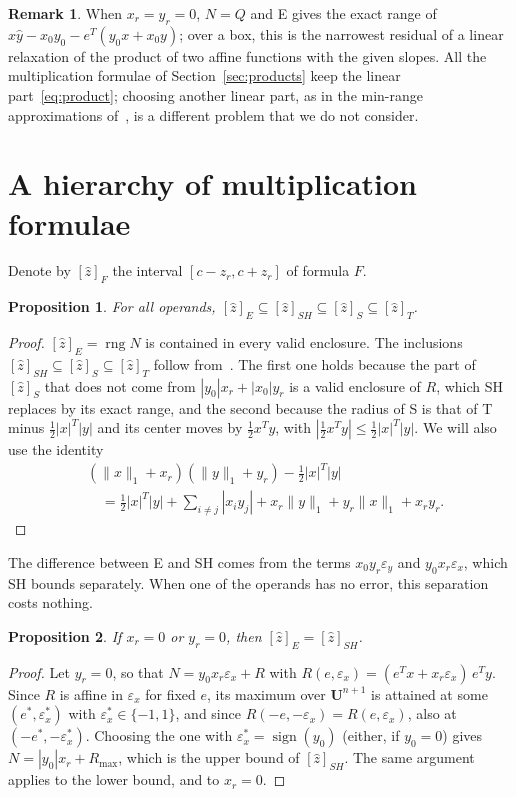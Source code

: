 \documentclass[10pt]{article}
\newtheorem{propo}{Proposition}
\theoremstyle{definition}
\newtheorem{remark}{Remark}
\newcommand{\U}{\mathbf{U}}
\newcommand{\eps}{\varepsilon}
\newcommand{\ex}{\eps_x}
\newcommand{\ey}{\eps_y}
\newcommand{\rng}{\operatorname{rng}}
\begin{document}
\begin{remark}
When $x_r=y_r=0$, $N=Q$ and E gives the exact range of $\hat x\hat y - x_0y_0 - e^T(y_0x+x_0y)$; over a box, this is the narrowest residual of a linear relaxation of the product of two affine functions with the given slopes. All the multiplication formulae of Section~\ref{sec:products} keep the linear part~\eqref{eq:product}; choosing another linear part, as in the min-range approximations of~\cite{stolfi1997self,skalna2013minrange}, is a different problem that we do not consider.
\end{remark}

\section{A hierarchy of multiplication formulae}
\label{sec:hierarchy}

Denote by $[\hat z]_F$ the interval $[c-z_r,c+z_r]$ of formula $F$.

\begin{propo}
\label{prop:chain}
For all operands, $[\hat z]_E \subseteq [\hat z]_{SH}\subseteq[\hat z]_S\subseteq[\hat z]_T$.
\end{propo}
\begin{proof}
$[\hat z]_E=\rng N$ is contained in every valid enclosure. The inclusions $[\hat z]_{SH}\subseteq[\hat z]_S\subseteq[\hat z]_T$ follow from~\cite[Prop.~3]{skalna2017new}. The first one holds because the part of $[\hat z]_S$ that does not come from $|y_0|x_r+|x_0|y_r$ is a valid enclosure of $R$, which SH replaces by its exact range, and the second because the radius of S is that of T minus $\tfrac12|x|^T|y|$ and its center moves by $\tfrac12x^Ty$, with $|\tfrac12x^Ty|\le\tfrac12|x|^T|y|$. We will also use the identity
\[
\begin{aligned}&(\|x\|_1+x_r)(\|y\|_1+y_r) - \tfrac12|x|^T|y|\\ &\quad= \tfrac12|x|^T|y|+\sum_{i\ne j}|x_iy_j| + x_r\|y\|_1+y_r\|x\|_1+x_ry_r .\end{aligned}
\]
\end{proof}

The difference between E and SH comes from the terms $x_0y_r\ey$ and $y_0x_r\ex$, which SH bounds separately. When one of the operands has no error, this separation costs nothing.

\begin{propo}
\label{prop:oneerror}
If $x_r=0$ or $y_r=0$, then $[\hat z]_E=[\hat z]_{SH}$.
\end{propo}
\begin{proof}
Let $y_r=0$, so that $N = y_0x_r\ex + R$ with $R(e,\ex)=(e^Tx+x_r\ex)\,e^Ty$. Since $R$ is affine in $\ex$ for fixed $e$, its maximum over $\U^{n+1}$ is attained at some $(e^*,\ex^*)$ with $\ex^*\in\{-1,1\}$, and since $R(-e,-\ex)=R(e,\ex)$, also at $(-e^*,-\ex^*)$. Choosing the one with $\ex^*=\operatorname{sign}(y_0)$ (either, if $y_0=0$) gives $N = |y_0|x_r + R_{\max}$, which is the upper bound of $[\hat z]_{SH}$. The same argument applies to the lower bound, and to $x_r=0$.
\end{proof}
\end{document}
